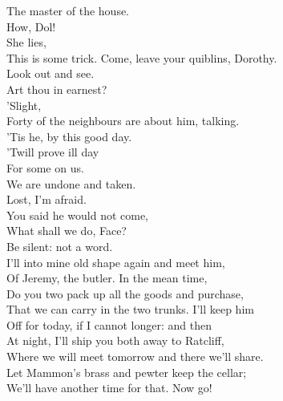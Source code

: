\documentclass[a4paper,oneside,12pt]{memoir}
\begin{document}
\begin{drama*}
The master of the house.\\
\subtlespeaks {} How, Dol!\\
\facespeaks {} She lies,\\
This is some trick. Come, leave your quiblins, Dorothy.\\
\dolspeaks Look out and see.\\
\subtlespeaks {} Art thou in earnest?\\
\dolspeaks {} 'Slight,\\
Forty of the neighbours are about him, talking.\\
\facespeaks 'Tis he, by this good day.\\
\dolspeaks {} 'Twill prove ill day\\
For some on us.\\
\facespeaks {} We are undone and taken.\\
\dolspeaks Lost, I'm afraid.\\
\subtlespeaks {} You said he would not come,\\
What shall we do, Face?\\
\facespeaks {} Be silent: not a word.\\
I'll into mine old shape again and meet him,\\
Of Jeremy, the butler. In the mean time,\\
Do you two pack up all the goods and purchase,\\
That we can carry in the two trunks. I'll keep him\\
Off for today, if I cannot longer: and then\\
At night, I'll ship you both away to Ratcliff,\\
Where we will meet tomorrow and there we'll share.\\
Let Mammon's brass and pewter keep the cellar;\\
We'll have another time for that. Now go!\\

\scene


\end{drama*}
\end{document}
